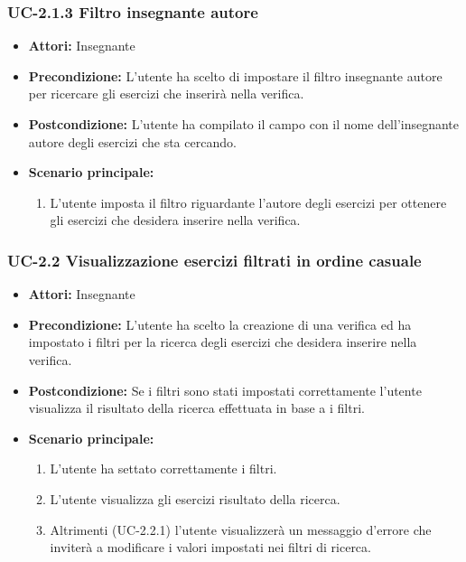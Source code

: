 \subsubsection{UC-2.1.3 Filtro insegnante autore}
\begin{itemize}
		\item \textbf{Attori: } Insegnante
		
		\item \textbf{Precondizione: }L'utente ha scelto di impostare il filtro insegnante autore per ricercare gli esercizi che inserirà nella verifica.
		\item \textbf{Postcondizione: }L'utente ha compilato il campo con il nome dell'insegnante autore degli esercizi che sta cercando.\item \textbf{Scenario principale: }
		\begin{enumerate}
		\item L'utente imposta il filtro riguardante l'autore degli esercizi per ottenere gli esercizi che desidera inserire nella verifica.
		\end{enumerate}
\end{itemize}
\subsubsection{UC-2.2 Visualizzazione esercizi filtrati in ordine casuale}
\begin{itemize}
		\item \textbf{Attori: } Insegnante
		
		\item \textbf{Precondizione: }L'utente ha scelto la creazione di una verifica ed ha impostato i filtri per la ricerca degli esercizi che desidera inserire nella verifica.
		\item \textbf{Postcondizione: }Se i filtri sono stati impostati correttamente l'utente visualizza il risultato della ricerca effettuata in base a i filtri.
		\item \textbf{Scenario principale: }
		\begin{enumerate}
		\item L'utente ha settato correttamente i filtri.
		\item L'utente visualizza gli esercizi risultato della ricerca.
		\item Altrimenti (UC-2.2.1) l'utente visualizzerà un messaggio d'errore che inviterà a modificare i valori impostati nei filtri di ricerca.
		\end{enumerate}
\end{itemize}
